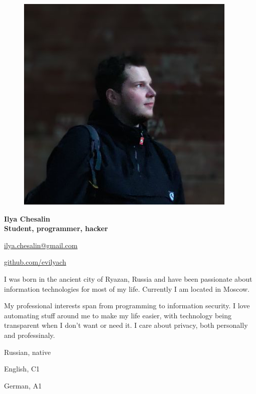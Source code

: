 \begin{figure}
	\hfill
	\includegraphics[width=0.6\columnwidth]{photo}
	\vspace{-7cm}
\end{figure}

\begin{flushright}\small

\end{flushright}\normalsize
\framebreak


\Huge\bfseries {{\color{Cyan} Ilya} {\color{Black} Chesalin}} \\
\Large\bfseries Student, programmer, hacker \\

\normalsize\normalfont


 \url{ilya.chesalin@gmail.com}

 \url{github.com/evilyach}

\SmallSep

I was born in the ancient city of Ryazan, Russia and have been passionate about
information technologies for most of my life. Currently I am located in Moscow.

My professional interests span from programming to information security. I love
automating stuff around me to make my life easier, with technology being transparent
when I don't want or need it. I care about privacy, both personally and professinaly.


\Sep


\begin{multicols}{3}
\begin{compactitem}[\color{Cyan}$\circ$]
    \item Russian, native
    \item English, C1
    \item German, A1
\end{compactitem}
\end{multicols}

